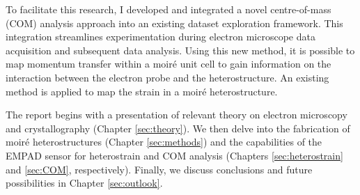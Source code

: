 To facilitate this research, I developed and integrated a novel centre-of-mass (COM) analysis approach into an existing dataset exploration framework. This integration streamlines experimentation during electron microscope data acquisition and subsequent data analysis. Using this new method, it is possible to map momentum transfer within a moiré unit cell to gain information on the interaction between the electron probe and the heterostructure. An existing method is applied to map the strain in a moiré heterostructure.

The report begins with a presentation of relevant theory on electron microscopy and crystallography (Chapter \ref{sec:theory}). We then delve into the fabrication of moiré heterostructures (Chapter \ref{sec:methods}) and the capabilities of the EMPAD sensor for heterostrain and COM analysis (Chapters \ref{sec:heterostrain} and \ref{sec:COM}, respectively). Finally, we discuss conclusions and future possibilities in Chapter \ref{sec:outlook}.

